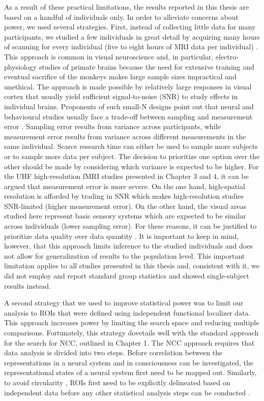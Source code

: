 As a result of these practical limitations, the results reported in this thesis are based on a handful of individuals only. In order to alleviate concerns about power, we used several strategies. First, instead of collecting little data for many participants, we studied a few individuals in great detail by acquiring many hours of scanning for every individual (five to eight hours of MRI data per individual) \parencite{Poldrack2017b}. This approach is common in visual neuroscience and, in particular, electro-physiology studies of primate brains because the need for extensive training and eventual sacrifice of the monkeys makes large sample sizes impractical and unethical. The approach is made possible by relatively large responses in visual cortex that usually yield sufficient signal-to-noise (SNR) to study effects in individual brains. Proponents of such small-N designs point out that neural and behavioural studies usually face a trade-off between sampling and measurement error \parencite{Kolossa2018, Smith2018}. Sampling error results from variance across participants, while measurement error results from variance across different measurements in the same individual. Scarce research time can either be used to sample more subjects or to sample more data per subject. The decision to prioritize one option over the other should be made by considering which variance is expected to be higher. For the UHF high-resolution fMRI studies presented in Chapter 3 and 4, it can be argued that measurement error is more severe. On the one hand, high-spatial resolution is afforded by trading in SNR which makes high-resolution studies SNR-limited (higher measurement error). On the other hand, the visual areas studied here represent basic sensory systems which are expected to be similar across individuals (lower sampling error). For these reasons, it can be justified to prioritize data quality over data quantity \parencite{Kolossa2018}. It is important to keep in mind, however, that this approach limits inference to the studied individuals and does not allow for generalization of results to the population level. This important limitation applies to all studies presented in this thesis and, consistent with it, we did not employ and report standard group statistics and showed single-subject results instead.

A second strategy that we used to improve statistical power was to limit our analysis to ROIs that were defined using independent functional localizer data. This approach increases power by limiting the search space and reducing multiple comparisons. Fortunately, this strategy dovetails well with the standard approach for the search for NCC, outlined in Chapter 1. The NCC approach requires that data analysis is divided into two steps. Before correlation between the representations in a neural system and in consciousness can be investigated, the representational states of a neural system first need to be mapped out. Similarly, to avoid circularity \parencite{Kriegeskorte2009}, ROIs first need to be explicitly delineated based on independent data before any other statistical analysis steps can be conducted \parencite{Poldrack2017a}.


